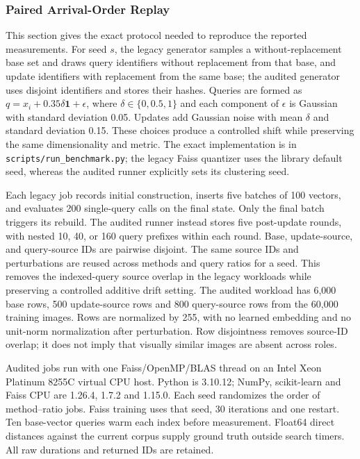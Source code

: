 \subsubsection{Paired Arrival-Order Replay}
This section gives the exact protocol needed to reproduce the reported measurements.
For seed $s$, the legacy generator samples a without-replacement base set and draws
query identifiers without replacement from that base, and update identifiers with
replacement from the same base; the audited generator uses disjoint
identifiers and stores their hashes. Queries are formed as
$q=x_i+0.35\delta\mathbf{1}+\epsilon$, where $\delta\in\{0,0.5,1\}$ and each component
of $\epsilon$ is Gaussian with standard deviation 0.05. Updates add Gaussian noise with
mean $\delta$ and standard deviation 0.15. These choices produce a controlled shift
while preserving the same dimensionality and metric. The exact implementation is in
\texttt{scripts/run\_benchmark.py}; the legacy Faiss quantizer uses the library default seed, whereas the audited runner
explicitly sets its clustering seed.

Each legacy job records initial construction, inserts five batches of 100 vectors,
and evaluates 200 single-query calls on the final state. Only the final batch triggers
its rebuild. The audited runner instead stores five post-update rounds, with nested
10, 40, or 160 query prefixes within each round. Base, update-source, and query-source
IDs are pairwise disjoint. The same source IDs and perturbations are reused across
methods and query ratios for a seed. This removes the indexed-query source overlap
in the legacy workloads while preserving a controlled additive drift setting.
The audited workload has 6,000 base rows, 500 update-source rows and 800 query-source
rows from the 60,000 training images. Rows are normalized by 255, with no learned
embedding and no unit-norm normalization after perturbation. Row disjointness removes
source-ID overlap; it does not imply that visually similar images are absent across roles.

Audited jobs run with one Faiss/OpenMP/BLAS thread on an Intel Xeon Platinum 8255C
virtual CPU host. Python is 3.10.12; NumPy, scikit-learn and Faiss CPU are 1.26.4,
1.7.2 and 1.15.0. Each seed randomizes the order of method--ratio jobs. Faiss training
uses that seed, 30 iterations and one restart. Ten base-vector queries warm each index
before measurement. Float64 direct distances against the current corpus supply
ground truth outside search timers. All raw durations and returned IDs are retained.

